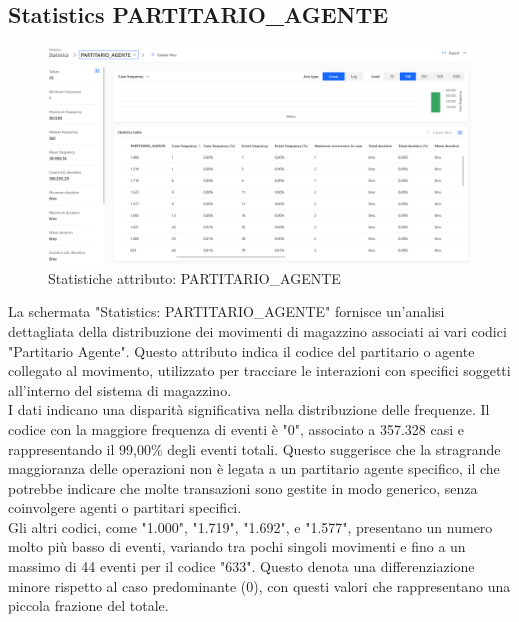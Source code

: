 \documentclass{article}
\begin{document}
\subsection{Statistics PARTITARIO\_AGENTE}
\begin{figure}[H]
    \centering
    \includegraphics[width=\textwidth]{imgMicrosoft/DatiReali/StatisticsPARTITARIOAGENTEDatiReali.png}
    \caption{Statistiche attributo: PARTITARIO\_AGENTE}
    \label{fig:statistics-PARTITARIO-AGENTE}
\end{figure}
La schermata "Statistics: PARTITARIO\_AGENTE" fornisce un'analisi dettagliata della distribuzione dei movimenti di magazzino associati ai vari codici "Partitario Agente". Questo attributo indica il codice del partitario o agente collegato al movimento, utilizzato per tracciare le interazioni con specifici soggetti all'interno del sistema di magazzino.\\
I dati indicano una disparità significativa nella distribuzione delle frequenze. Il codice con la maggiore frequenza di eventi è "0", associato a 357.328 casi e rappresentando il 99,00\% degli eventi totali. Questo suggerisce che la stragrande maggioranza delle operazioni non è legata a un partitario agente specifico, il che potrebbe indicare che molte transazioni sono gestite in modo generico, senza coinvolgere agenti o partitari specifici.\\
Gli altri codici, come "1.000", "1.719", "1.692", e "1.577", presentano un numero molto più basso di eventi, variando tra pochi singoli movimenti e fino a un massimo di 44 eventi per il codice "633". Questo denota una differenziazione minore rispetto al caso predominante (0), con questi valori che rappresentano una piccola frazione del totale.
\end{document}

